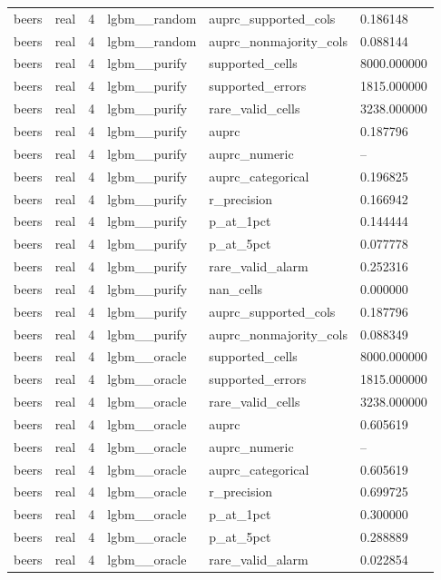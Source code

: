 \begin{tabular}{llllll}
beers & real & 4 & lgbm\_\_random & auprc\_supported\_cols & 0.186148 \\
beers & real & 4 & lgbm\_\_random & auprc\_nonmajority\_cols & 0.088144 \\
beers & real & 4 & lgbm\_\_purify & supported\_cells & 8000.000000 \\
beers & real & 4 & lgbm\_\_purify & supported\_errors & 1815.000000 \\
beers & real & 4 & lgbm\_\_purify & rare\_valid\_cells & 3238.000000 \\
beers & real & 4 & lgbm\_\_purify & auprc & 0.187796 \\
beers & real & 4 & lgbm\_\_purify & auprc\_numeric & -- \\
beers & real & 4 & lgbm\_\_purify & auprc\_categorical & 0.196825 \\
beers & real & 4 & lgbm\_\_purify & r\_precision & 0.166942 \\
beers & real & 4 & lgbm\_\_purify & p\_at\_1pct & 0.144444 \\
beers & real & 4 & lgbm\_\_purify & p\_at\_5pct & 0.077778 \\
beers & real & 4 & lgbm\_\_purify & rare\_valid\_alarm & 0.252316 \\
beers & real & 4 & lgbm\_\_purify & nan\_cells & 0.000000 \\
beers & real & 4 & lgbm\_\_purify & auprc\_supported\_cols & 0.187796 \\
beers & real & 4 & lgbm\_\_purify & auprc\_nonmajority\_cols & 0.088349 \\
beers & real & 4 & lgbm\_\_oracle & supported\_cells & 8000.000000 \\
beers & real & 4 & lgbm\_\_oracle & supported\_errors & 1815.000000 \\
beers & real & 4 & lgbm\_\_oracle & rare\_valid\_cells & 3238.000000 \\
beers & real & 4 & lgbm\_\_oracle & auprc & 0.605619 \\
beers & real & 4 & lgbm\_\_oracle & auprc\_numeric & -- \\
beers & real & 4 & lgbm\_\_oracle & auprc\_categorical & 0.605619 \\
beers & real & 4 & lgbm\_\_oracle & r\_precision & 0.699725 \\
beers & real & 4 & lgbm\_\_oracle & p\_at\_1pct & 0.300000 \\
beers & real & 4 & lgbm\_\_oracle & p\_at\_5pct & 0.288889 \\
beers & real & 4 & lgbm\_\_oracle & rare\_valid\_alarm & 0.022854 \\

\end{tabular}

